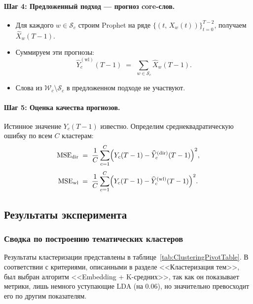 \documentclass[14pt,a4paper]{article}
\begin{document}
\paragraph{Шаг 4: Предложенный подход — прогноз core-слов.}

\begin{itemize}
  \item Для каждого \(w\in\mathcal S_c\) строим Prophet на ряде \(\{(t,\,X_w(t))\}_{t=0}^{T-2}\), 
    получаем \(\widehat{X}_w(T-1)\).
  \item Суммируем эти прогнозы:
  \[
    \widehat{Y}_c^{(\mathrm{wl})}(T-1)
    \;=\;
    \sum_{\,w\in\mathcal S_c} \widehat{X}_w(T-1).
  \]
  \item Слова из \(\mathcal W_c \setminus \mathcal S_c\) в предложенном подходе не участвуют.
\end{itemize}

\paragraph{Шаг 5: Оценка качества прогнозов.}

Истинное значение \(Y_c(T-1)\) известно. Определим среднеквадратическую ошибку по всем \(C\) кластерам:
\[
  \mathrm{MSE}_{\mathrm{dir}}
  \;=\; 
  \frac{1}{C}\sum_{c=1}^C 
    \Bigl(Y_c(T-1) - \widehat{Y}_c^{(\mathrm{dir})}(T-1)\Bigr)^2,
\]
\[
  \mathrm{MSE}_{\mathrm{wl}}
  \;=\;
  \frac{1}{C}\sum_{c=1}^C 
    \Bigl(Y_c(T-1) - \widehat{Y}_c^{(\mathrm{wl})}(T-1)\Bigr)^2.
\]








\subsection{Результаты эксперимента}

\subsubsection{Сводка по построению тематических кластеров}

Результаты кластеризации представлены в таблице~\ref{tab:ClusteringPivotTable}. В соответствии с критериями, описанными в разделе <<Кластеризация тем>>, был выбран алгоритм <<Embedding + K-средних>>, так как он показывает метрики, лишь немного уступающие LDA (на 0.06), но значительно превосходит его по другим показателям.

\end{document}

